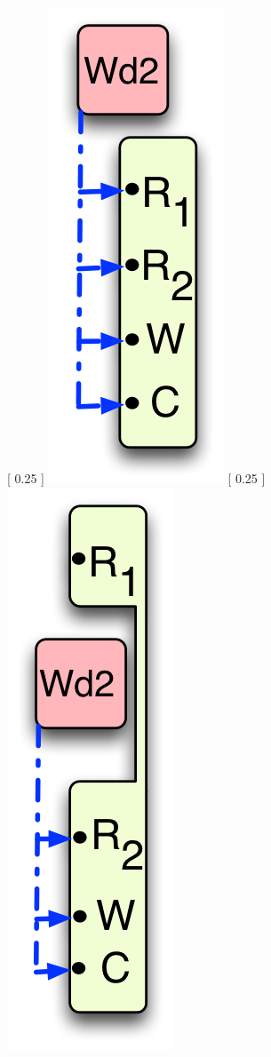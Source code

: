 \begin{figure}
\centering
\subcaptionbox {
  \label{fig:hb-eg-1}
} [
  0.25\columnwidth
] {
  \includegraphics[scale=0.5]{Figures/hb-eg-1}
}
\subcaptionbox {
  \label{fig:hb-eg-2}
} [
  0.25\columnwidth
] {
  \includegraphics[scale=0.5]{Figures/hb-eg-2}
}
\end{figure}
